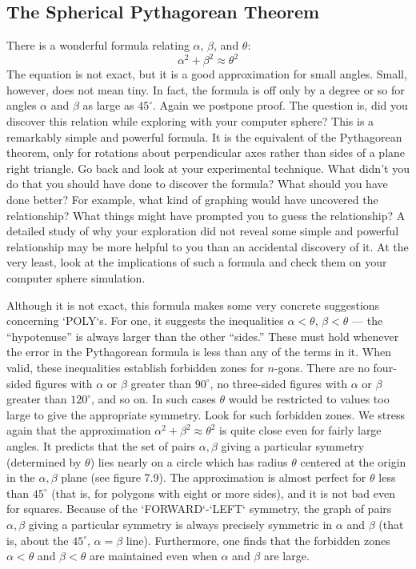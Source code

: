 \documentclass{book}
\begin{document}
\subsection{The Spherical Pythagorean Theorem}

There is a wonderful formula relating $\alpha$, $\beta$, and $\theta$:
$$\alpha^2 + \beta^2 \approx \theta^2$$
The equation is not exact, but it is a good approximation for small
angles. Small, however, does not mean tiny. In fact, the formula is off
only by a degree or so for angles $\alpha$ and $\beta$ as large as $45^{\circ}$. Again we
postpone proof. The question is, did you discover this relation while
exploring with your computer sphere? This is a remarkably simple and
powerful formula. It is the equivalent of the Pythagorean theorem, only
for rotations about perpendicular axes rather than sides of a plane right
triangle. Go back and look at your experimental technique. What didn't
you do that you should have done to discover the formula? What should
you have done better? For example, what kind of graphing would have
uncovered the relationship? What things might have prompted you to
guess the relationship? A detailed study of why your exploration did
not reveal some simple and powerful relationship may be more helpful
to you than an accidental discovery of it. At the very least, look at the
implications of such a formula and check them on your computer sphere
simulation.

Although it is not exact, this formula makes some very concrete
suggestions concerning \textsc{`POLY`}s. For one, it suggests the inequalities $\alpha <
\theta$, $\beta < \theta$ --- the ``hypotenuse'' is always larger than the other ``sides.''
These must hold whenever the error in the Pythagorean formula is less
than any of the terms in it. When valid, these inequalities establish
forbidden zones for $n$-gons. There are no four-sided figures with $\alpha$ or $\beta$
greater than $90^{\circ}$, no three-sided figures with $\alpha$ or $\beta$ greater than $120^{\circ}$,
and so on. In such cases $\theta$ would be restricted to values too large to give
the appropriate symmetry. Look for such forbidden zones.
We stress again that the approximation $\alpha^2 +  \beta^2 \approx \theta^2$ is quite close
even for fairly large angles. It predicts that the set of pairs $\alpha, \beta$ giving
a particular symmetry (determined by $\theta$) lies nearly on a circle which
has radius $\theta$ centered at the origin in the $\alpha, \beta$ plane (see figure 7.9). The
approximation is almost perfect for $\theta$ less than $45^{\circ}$ (that is, for polygons
with eight or more sides), and it is not bad even for squares. Because of
the \textsc{`FORWARD`}-\textsc{`LEFT`} symmetry, the graph of pairs $\alpha , \beta$ giving a particular
symmetry is always precisely symmetric in $\alpha$ and $\beta$ (that is, about the
$45^{\circ}$, $\alpha = \beta$ line). Furthermore, one finds that the forbidden zones $\alpha < \theta$
and $\beta < \theta$ are maintained even when $\alpha$ and $\beta$ are large.
\end{document}
